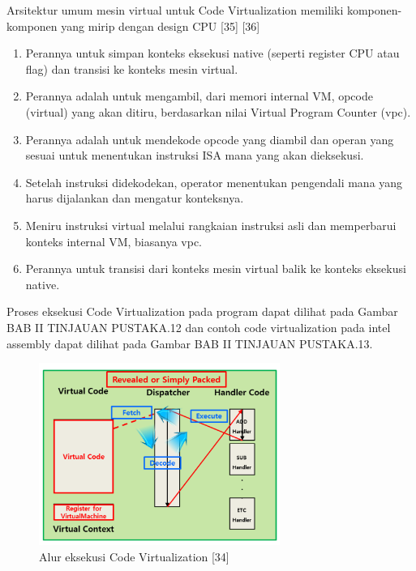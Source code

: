 Arsitektur umum mesin virtual untuk Code Virtualization memiliki komponen-komponen yang mirip dengan design CPU [35] [36]
\begin{enumerate}
	\item {} Perannya untuk simpan konteks eksekusi native (seperti register CPU atau flag) dan transisi ke konteks mesin virtual.
	\item {} Perannya adalah untuk mengambil, dari memori internal VM, opcode (virtual) yang akan ditiru, berdasarkan nilai Virtual Program Counter (vpc).
	\item {} Perannya adalah untuk mendekode opcode yang diambil dan operan yang sesuai untuk menentukan instruksi ISA mana yang akan dieksekusi.
	\item {} Setelah instruksi didekodekan, operator menentukan pengendali mana yang harus dijalankan dan mengatur konteksnya.
	\item {} Meniru instruksi virtual melalui rangkaian instruksi asli dan memperbarui konteks internal VM, biasanya vpc.
	\item {} Perannya untuk transisi dari konteks mesin virtual balik ke konteks eksekusi native.
\end{enumerate}

Proses eksekusi Code Virtualization pada program dapat dilihat pada Gambar BAB II TINJAUAN PUSTAKA.12 dan contoh code virtualization pada intel assembly dapat dilihat pada Gambar BAB II TINJAUAN PUSTAKA.13.

\begin{figure}
	\centering
	\includegraphics[width=0.7\textwidth]
	{assets/pics/virtualization_execution.png}
	\caption{Alur eksekusi Code Virtualization [34]}
\end{figure}

